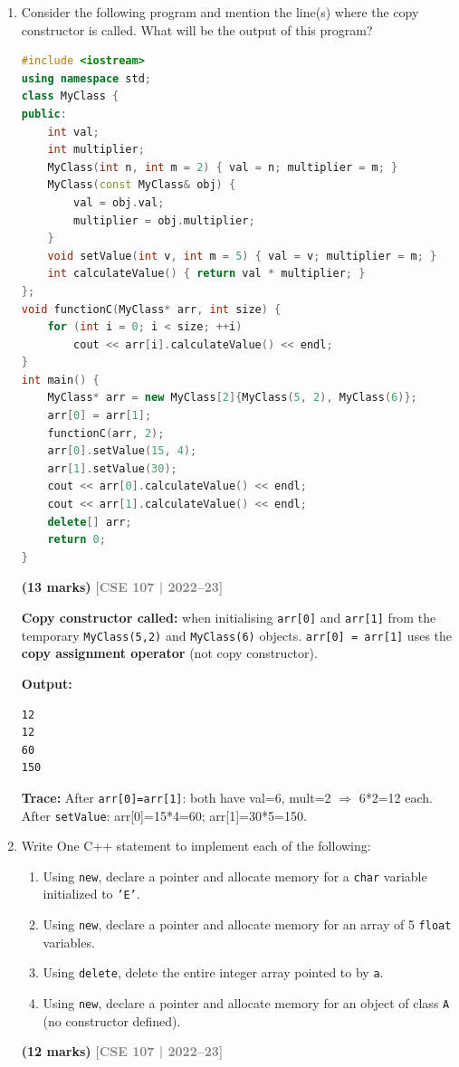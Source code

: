 \documentclass[12pt,a3paper]{article}
\newcommand{\yr}[1]{\hfill\textcolor{gray}{\small\textbf{[#1]}}}
\newcommand{\mk}[1]{\textcolor{orange!70!black}{\small\textbf{(#1 marks)}}}
\begin{document}
\begin{enumerate}
\item Consider the following program and mention the line(s) where the copy constructor is called. What will be the output of this program?
\begin{lstlisting}[language=C++]
#include <iostream>
using namespace std;
class MyClass {
public:
    int val;
    int multiplier;
    MyClass(int n, int m = 2) { val = n; multiplier = m; }
    MyClass(const MyClass& obj) {
        val = obj.val;
        multiplier = obj.multiplier;
    }
    void setValue(int v, int m = 5) { val = v; multiplier = m; }
    int calculateValue() { return val * multiplier; }
};
void functionC(MyClass* arr, int size) {
    for (int i = 0; i < size; ++i)
        cout << arr[i].calculateValue() << endl;
}
int main() {
    MyClass* arr = new MyClass[2]{MyClass(5, 2), MyClass(6)};
    arr[0] = arr[1];
    functionC(arr, 2);
    arr[0].setValue(15, 4);
    arr[1].setValue(30);
    cout << arr[0].calculateValue() << endl;
    cout << arr[1].calculateValue() << endl;
    delete[] arr;
    return 0;
}
\end{lstlisting}
\mk{13}
\yr{CSE 107 | 2022--23}


\begin{tcolorbox}[enhanced,breakable,ansbox,colback=cE!4,colframe=cE,
  boxrule=0.8pt,arc=5pt,
  title={\textbf{Answer --- MyClass array --- copy constructor lines and output}},
  fonttitle=\bfseries\color{white},colbacktitle=cE]

\textbf{Copy constructor called:} when initialising \texttt{arr[0]}
and \texttt{arr[1]} from the temporary \texttt{MyClass(5,2)} and
\texttt{MyClass(6)} objects.
\texttt{arr[0] = arr[1]} uses the \textbf{copy assignment operator}
(not copy constructor).

\textbf{Output:}
\begin{lstlisting}
12
12
60
150
\end{lstlisting}

\textbf{Trace:} After \texttt{arr[0]=arr[1]}: both have val=6,
mult=2 $\Rightarrow$ 6*2=12 each.
After \texttt{setValue}: arr[0]=15*4=60; arr[1]=30*5=150.

\end{tcolorbox}



\item Write One C++ statement to implement each of the following:
\begin{enumerate}
  \item Using \texttt{new}, declare a pointer and allocate memory for a \texttt{char} variable initialized to \texttt{'E'}.
  \item Using \texttt{new}, declare a pointer and allocate memory for an array of 5 \texttt{float} variables.
  \item Using \texttt{delete}, delete the entire integer array pointed to by \texttt{a}.
  \item Using \texttt{new}, declare a pointer and allocate memory for an object of class \texttt{A} (no constructor defined).
\end{enumerate}
\mk{12}
\yr{CSE 107 | 2022--23}



\end{enumerate}
\end{document}
